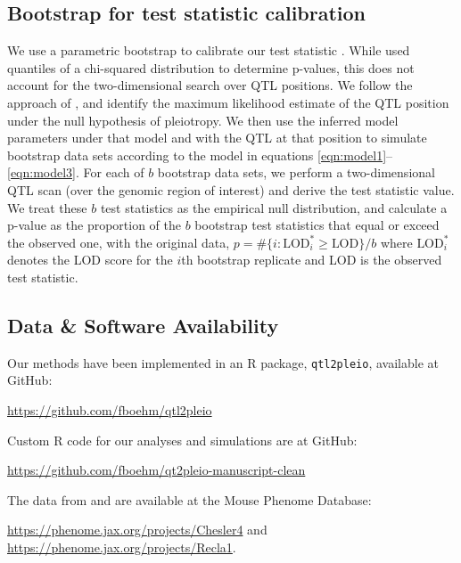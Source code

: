 \documentclass[oneside]{book}\usepackage[]{graphicx}\usepackage[]{color}
\begin{document}
\subsection{Bootstrap for test statistic calibration}

We use a parametric bootstrap to calibrate our test statistic
\citep{efron1979}. While \citet{jiang1995multiple} used quantiles of a
chi-squared distribution to determine p-values, this does not account
for the two-dimensional search over QTL positions.
We follow the approach of \citet{tian2016dissection}, and identify
the maximum likelihood estimate of the QTL position under the null
hypothesis of pleiotropy.
We then use the inferred model parameters under that model and with
the QTL at that position to simulate bootstrap data sets according to
the model in equations \ref{eqn:model1}--\ref{eqn:model3}.
For each of $b$ bootstrap data sets, we
perform a two-dimensional QTL scan (over the genomic region of
interest) and derive the test
statistic value. We treat these $b$ test statistics as the
empirical null distribution, and calculate a p-value as the
proportion of the $b$ bootstrap test statistics that equal or exceed
the observed one, with the original data,
$p = \# \{ i:\text{LOD}^*_i \geq \text{LOD}\} / b$
where $\text{LOD}_i^*$ denotes the LOD score for the $i$th bootstrap
replicate and LOD is the observed test statistic.



\subsection{Data \& Software Availability}

Our methods have been implemented in an R package, \texttt{qtl2pleio},
available at GitHub:

\href{https://github.com/fboehm/qtl2pleio}{https://github.com/fboehm/qtl2pleio}

\noindent Custom R code for our analyses and simulations are at GitHub:

\href{https://github.com/fboehm/qtl2pleio-manuscript-clean}{https://github.com/fboehm/qt2pleio-manuscript-clean}

\noindent The data from \citet{recla2014precise} and
\citet{logan2013high} are available at the Mouse Phenome Database:

\href{https://phenome.jax.org/projects/Chesler4}{https://phenome.jax.org/projects/Chesler4} and \href{https://phenome.jax.org/projects/Recla1}{https://phenome.jax.org/projects/Recla1}.
\end{document}
